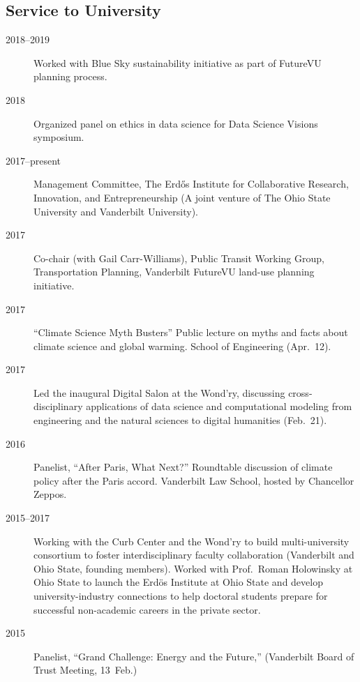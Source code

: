 \documentclass[10pt]{article}
\begin{document}
    \subsection{Service to University}
        \begin{description}
            \item[2018--2019] Worked with Blue Sky sustainability initiative as part of FutureVU planning process.
            \item[2018] Organized panel on ethics in data science for Data Science Visions symposium.
            \item[2017--present] Management Committee, The Erd\H{o}s Institute for Collaborative Research, Innovation, and Entrepreneurship (A joint venture of The Ohio State University and Vanderbilt University).
            \item[2017] Co-chair (with Gail Carr-Williams), Public Transit Working Group, Transportation Planning, Vanderbilt FutureVU land-use planning initiative.
            \item[2017] ``Climate Science Myth Busters'' Public lecture on myths and facts about climate science and global warming. School of Engineering (Apr.~12).
            \item[2017] Led the inaugural Digital Salon at the Wond'ry, discussing cross-disciplinary applications of data science and computational modeling from engineering and the natural sciences to digital humanities (Feb.~21).
            \item[2016] Panelist, ``After Paris, What Next?''  Roundtable discussion of climate policy after the Paris accord. Vanderbilt Law School, hosted by Chancellor Zeppos.
            \item[2015--2017] Working with the Curb Center and the Wond'ry to build multi-university consortium to foster interdisciplinary faculty collaboration (Vanderbilt and Ohio State, founding members).  Worked with Prof.\ Roman Holowinsky at Ohio State to launch the Erd\"os Institute at Ohio State and develop university-industry connections to help doctoral students prepare for successful non-academic careers in the private sector.
            \item[2015] Panelist, ``Grand Challenge: Energy and the Future,'' (Vanderbilt Board of Trust Meeting, 13~Feb.)

\end{description}
\end{document}
